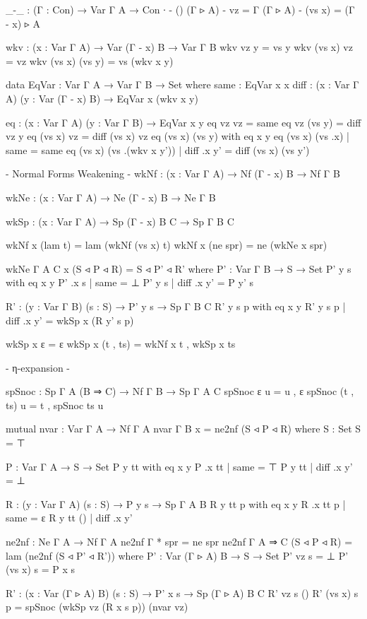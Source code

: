 \begin{code}
_-_ : (Γ : Con) → Var Γ A → Con
∙ - ()
(Γ ▹ A) - vz = Γ
(Γ ▹ A) - (vs x) = (Γ - x) ▹ A

wkv : (x : Var Γ A) → Var (Γ - x) B → Var Γ B
wkv vz y = vs y
wkv (vs x) vz = vz
wkv (vs x) (vs y) = vs (wkv x y)

data EqVar : Var Γ A → Var Γ B → Set where
  same : EqVar x x
  diff : (x : Var Γ A) (y : Var (Γ - x) B) → EqVar x (wkv x y)

eq : (x : Var Γ A) (y : Var Γ B) → EqVar x y
eq vz vz = same
eq vz (vs y) = diff vz y
eq (vs x) vz = diff (vs x) vz
eq (vs x) (vs y) with eq x y
eq (vs x) (vs .x)            | same = same
eq (vs x) (vs .(wkv x y')) | diff .x y' = diff (vs x) (vs y')

{- Normal Forms Weakening -}
wkNf : (x : Var Γ A) → Nf (Γ - x) B → Nf Γ B

wkNe : (x : Var Γ A) → Ne (Γ - x) B → Ne Γ B

wkSp : (x : Var Γ A) → Sp (Γ - x) B C → Sp Γ B C

wkNf x (lam t) = lam (wkNf (vs x) t)
wkNf x (ne spr) = ne (wkNe x spr)

wkNe {Γ} {A} {C} x (S ◃ P ◃ R) = S ◃ P' ◃ R'
  where
  P' : Var Γ B → S → Set
  P' y  s with eq x y
  P' .x s | same = ⊥
  P' y  s | diff .x y' = P y' s

  R' : (y : Var Γ B) (s : S) → P' y s → Sp Γ B C
  R' y s p with eq x y
  R' y s p | diff .x y' = wkSp x (R y' s p)

wkSp x ε = ε
wkSp x (t , ts) = wkNf x t , wkSp x ts

{- η-expansion -}

spSnoc : Sp Γ A (B ⇒ C) → Nf Γ B → Sp Γ A C
spSnoc ε u = u , ε
spSnoc (t , ts) u = t , spSnoc ts u

mutual
  nvar : Var Γ A → Nf Γ A
  nvar {Γ} {B} x = ne2nf (S ◃ P ◃ R)
    where
    S : Set
    S = ⊤

    P : Var Γ A → S → Set
    P y  tt with eq x y
    P .x tt | same = ⊤
    P y  tt | diff .x y' = ⊥

    R : (y : Var Γ A) (s : S) → P y s → Sp Γ A B
    R y tt p with eq x y
    R .x tt p | same = ε
    R y tt () | diff .x y'

  ne2nf : Ne Γ A → Nf Γ A
  ne2nf {Γ} {*} spr = ne spr
  ne2nf {Γ} {A ⇒ C} (S ◃ P ◃ R) = lam (ne2nf (S ◃ P' ◃ R'))
    where
    P' : Var (Γ ▹ A) B → S → Set
    P' vz s = ⊥
    P' (vs x) s = P x s

    R' : (x : Var (Γ ▹ A) B) (s : S) → P' x s → Sp (Γ ▹ A) B C
    R' vz s ()
    R' (vs x) s p = spSnoc (wkSp vz (R x s p)) (nvar vz)


\end{code}
